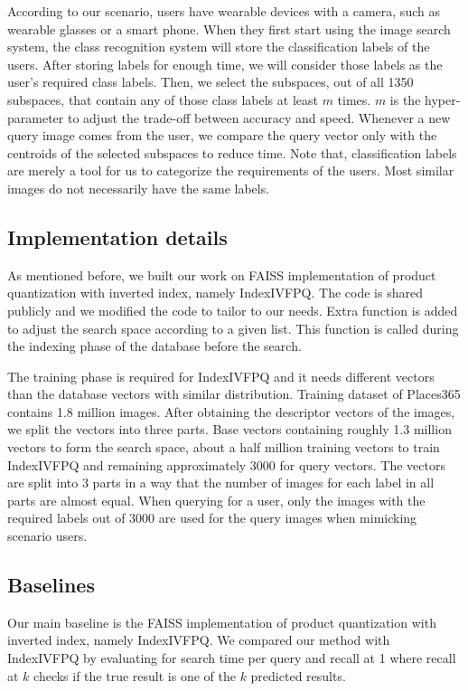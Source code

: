 According to our scenario, users have wearable devices with a camera, such as wearable glasses or a smart phone. 
When they first start using the image search system, the class recognition system will store the classification labels of the users. 
After storing labels for enough time, we will consider those labels as the user's required class labels.
Then, we select the subspaces, out of all 1350 subspaces, that contain any of those class labels at least $m$ times. 
$m$ is the hyper-parameter to adjust the trade-off between accuracy and speed.
Whenever a new query image comes from the user, we compare the query vector only with the centroids of the selected subspaces to reduce time.
Note that, classification labels are merely a tool for us to categorize the requirements of the users.
Most similar images do not necessarily have the same labels.


\subsection{Implementation details}

As mentioned before, we built our work on FAISS implementation\cite{faiss} of product quantization with inverted index, namely IndexIVFPQ. 
The code is shared publicly and we modified the code to tailor to our needs.
Extra function is added to adjust the search space according to a given list. 
This function is called during the indexing phase of the database before the search.

The training phase is required for IndexIVFPQ and it needs different vectors than the database vectors with similar distribution.
Training dataset of Places365 contains 1.8 million images. 
After obtaining the descriptor vectors of the images, we split the vectors into three parts.
Base vectors containing roughly 1.3 million vectors to form the search space, about a half million training vectors to train IndexIVFPQ and remaining approximately 3000 for query vectors.
The vectors are split into 3 parts in a way that the number of images for each label in all parts are almost equal.
When querying for a user, only the images with the required labels out of 3000 are used for the query images when mimicking scenario users.

\subsection{Baselines}

Our main baseline is the FAISS implementation\cite{faiss} of product quantization with inverted index, namely IndexIVFPQ.
We compared our method with IndexIVFPQ by evaluating for search time per query and recall at 1 where recall at $k$ checks if the true result is one of the $k$ predicted results.

